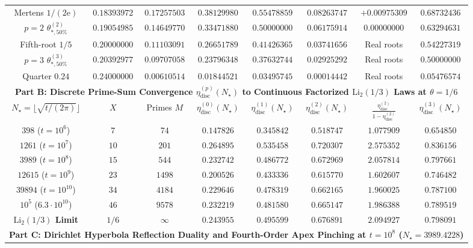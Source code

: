 \documentclass[11pt,reqno]{amsart}
\theoremstyle{definition}
\theoremstyle{remark}
\numberwithin{equation}{section}
\newcommand{\ee}{\mathrm{e}}
\begin{document}
\begin{table}[htbp]
\begin{tabular}{@{}cccccccc@{}}
Mertens $1/(2\ee)$ & $0.18393972$ & $0.17257503$ & $0.38129980$ & $0.55478859$ & $0.08263747$ & $+0.00975309$ & $0.68732436$ \\
$p=2$ $\theta_{*,50\%}^{(2)}$ & $0.19054985$ & $0.14649770$ & $0.33471880$ & $\mathbf{0.50000000}$ & $0.06175914$ & $0.00000000$ & $0.63294631$ \\
Fifth-root $1/5$ & $0.20000000$ & $0.11103091$ & $0.26651789$ & $0.41426365$ & $0.03741656$ & Real roots & $0.54227319$ \\
$p=3$ $\theta_{*,50\%}^{(3)}$ & $0.20392977$ & $0.09707058$ & $0.23796348$ & $0.37632744$ & $0.02925292$ & Real roots & $\mathbf{0.50000000}$ \\
Quarter $0.24$ & $0.24000000$ & $0.00610514$ & $0.01844521$ & $0.03495745$ & $0.00014442$ & Real roots & $0.05476574$ \\
\midrule
\multicolumn{8}{c}{\textbf{Part B: Discrete Prime-Sum Convergence $\eta_{\mathrm{disc}}^{(p)}(N_\star)$ to Continuous Factorized $\mathrm{Li}_2(1/3)$ Laws at $\theta = 1/6$}} \\
\midrule
$N_\star = \lfloor\sqrt{t/(2\pi)}\rfloor$ & $X$ & Primes $M$ & $\eta_{\mathrm{disc}}^{(0)}(N_\star)$ & $\eta_{\mathrm{disc}}^{(1)}(N_\star)$ & $\eta_{\mathrm{disc}}^{(2)}(N_\star)$ & $\frac{\eta_{\mathrm{disc}}^{(2)}}{1-\eta_{\mathrm{disc}}^{(2)}}$ & $\eta_{\mathrm{disc}}^{(3)}(N_\star)$ \\
\midrule
$398$ ($t = 10^6$) & $7$ & $74$ & $0.147826$ & $0.345842$ & $0.518747$ & $1.077909$ & $0.654850$ \\
$1261$ ($t = 10^7$) & $10$ & $201$ & $0.264895$ & $0.535458$ & $0.720307$ & $2.575352$ & $0.836156$ \\
$3989$ ($t = 10^8$) & $15$ & $544$ & $0.232742$ & $0.486772$ & $0.672969$ & $2.057814$ & $0.797661$ \\
$12615$ ($t = 10^9$) & $23$ & $1498$ & $0.200526$ & $0.433336$ & $0.615770$ & $1.602607$ & $0.746482$ \\
$39894$ ($t = 10^{10}$) & $34$ & $4184$ & $0.229646$ & $0.478319$ & $0.662165$ & $1.960025$ & $0.787100$ \\
$10^5$ ($6.3\cdot 10^{10}$) & $46$ & $9578$ & $0.232219$ & $0.481580$ & $0.665147$ & $1.986388$ & $0.789519$ \\
\textbf{$\mathrm{Li}_2(1/3)$ Limit} & $1/6$ & $\infty$ & $\mathbf{0.243955}$ & $\mathbf{0.495599}$ & $\mathbf{0.676891}$ & $\mathbf{2.094927}$ & $\mathbf{0.798091}$ \\
\midrule
\multicolumn{8}{c}{\textbf{Part C: Dirichlet Hyperbola Reflection Duality and Fourth-Order Apex Pinching at $t = 10^8$ ($N_\star = 3989.4228$)}} \\

\end{tabular}
\end{table}
\end{document}
